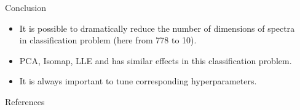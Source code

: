 \documentclass[final,hyperref={pdfpagelabels=false}]{beamer}
\begin{document}
\begin{frame}[t]
\begin{columns}[t]
\begin{column}{.465\textwidth}

\begin{block}{Conclusion}

\begin{itemize}
\item It is possible to dramatically reduce the number of dimensions of spectra in classification problem (here from 778 to 10).
\item PCA, Isomap, LLE and has similar effects in this classification problem.
\item It is always important to tune corresponding hyperparameters.
\end{itemize}

\end{block}


\begin{block}{References}
        
\nocite{*} %
\small{
}

\end{block}





\end{column} %

\begin{column}{.015\textwidth}\end{column} %

\end{columns} %

\end{frame} %
\end{document}
